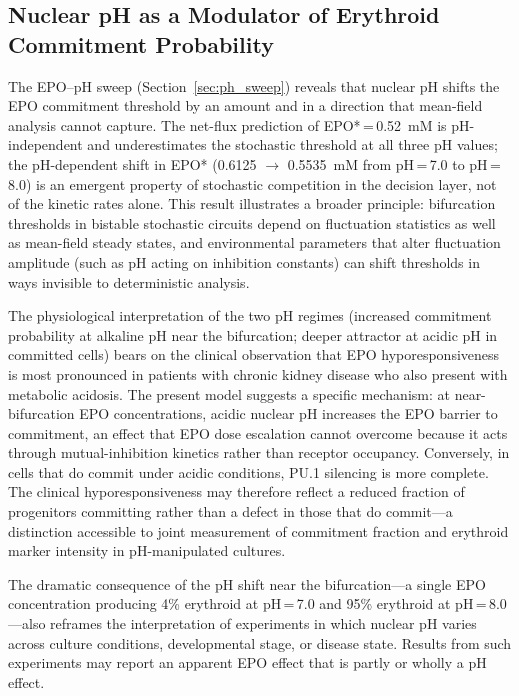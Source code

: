 \subsection{Nuclear pH as a Modulator of Erythroid Commitment Probability}

The EPO--pH sweep (Section~\ref{sec:ph_sweep}) reveals that nuclear pH shifts
the EPO commitment threshold by an amount and in a direction that mean-field
analysis cannot capture. The net-flux prediction of EPO*\,=\,0.52~mM is
pH-independent and underestimates the stochastic threshold at all three pH
values; the pH-dependent shift in EPO* (0.6125 $\to$ 0.5535~mM from pH\,=\,7.0 to
pH\,=\,8.0) is an emergent property of stochastic competition in the decision
layer, not of the kinetic rates alone. This result illustrates a broader
principle: bifurcation thresholds in bistable stochastic circuits depend on
fluctuation statistics as well as mean-field steady states, and environmental
parameters that alter fluctuation amplitude (such as pH acting on inhibition
constants) can shift thresholds in ways invisible to deterministic analysis.

The physiological interpretation of the two pH regimes (increased commitment
probability at alkaline pH near the bifurcation; deeper attractor at acidic pH
in committed cells) bears on the clinical observation that EPO hyporesponsiveness
is most pronounced in patients with chronic kidney disease who also present with
metabolic acidosis. The present model suggests a specific mechanism: at
near-bifurcation EPO concentrations, acidic nuclear pH increases the EPO
barrier to commitment, an effect that EPO dose escalation cannot overcome because
it acts through mutual-inhibition kinetics rather than receptor occupancy.
Conversely, in cells that do commit under acidic conditions, PU.1 silencing is
more complete. The clinical hyporesponsiveness may therefore reflect a reduced
fraction of progenitors committing rather than a defect in those that do
commit---a distinction accessible to joint measurement of commitment fraction and
erythroid marker intensity in pH-manipulated cultures.

The dramatic consequence of the pH shift near the bifurcation---a single EPO
concentration producing 4\% erythroid at pH\,=\,7.0 and 95\% erythroid at
pH\,=\,8.0---also reframes the interpretation of experiments in which nuclear pH
varies across culture conditions, developmental stage, or disease state. Results
from such experiments may report an apparent EPO effect that is partly or wholly
a pH effect.

